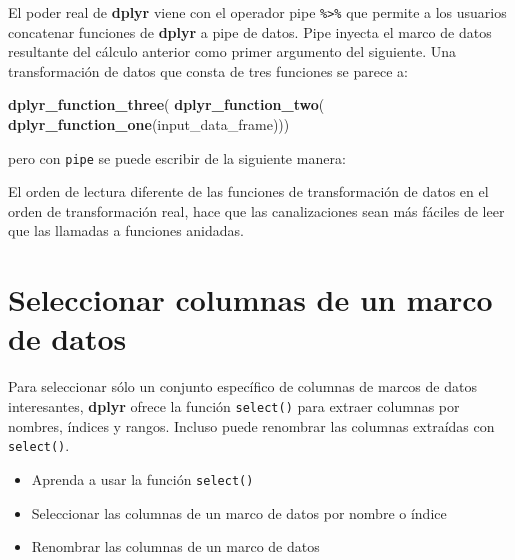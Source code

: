 \documentclass[
]{book}
\newenvironment{Shaded}{\begin{snugshade}}{\end{snugshade}}
\newcommand{\KeywordTok}[1]{\textcolor[rgb]{0.13,0.29,0.53}{\textbf{#1}}}
\newcommand{\NormalTok}[1]{#1}
\newcommand{\OperatorTok}[1]{\textcolor[rgb]{0.81,0.36,0.00}{\textbf{#1}}}
\newcommand{\StringTok}[1]{\textcolor[rgb]{0.31,0.60,0.02}{#1}}
\providecommand{\tightlist}{%
  \setlength{\itemsep}{0pt}\setlength{\parskip}{0pt}}
\begin{document}
El poder real de \textbf{dplyr} viene con el operador pipe \texttt{\%\textgreater{}\%} que permite a los usuarios concatenar funciones de \textbf{dplyr} a pipe de datos. Pipe inyecta el marco de datos resultante del cálculo anterior como primer argumento del siguiente. Una transformación de datos que consta de tres funciones se parece a:

\begin{Shaded}
\begin{Highlighting}[]
\KeywordTok{dplyr_function_three}\NormalTok{(}
  \KeywordTok{dplyr_function_two}\NormalTok{(}
    \KeywordTok{dplyr_function_one}\NormalTok{(input_data_frame)))}
\end{Highlighting}
\end{Shaded}

pero con \texttt{pipe} se puede escribir de la siguiente manera:

\begin{Shaded}
\end{Shaded}

El orden de lectura diferente de las funciones de transformación de datos en el orden de transformación real, hace que las canalizaciones sean más fáciles de leer que las llamadas a funciones anidadas.

\hypertarget{seleccionar-columnas-de-un-marco-de-datos}{%
\section{Seleccionar columnas de un marco de datos}\label{seleccionar-columnas-de-un-marco-de-datos}}

Para seleccionar sólo un conjunto específico de columnas de marcos de datos interesantes, \textbf{dplyr} ofrece la función \texttt{select()} para extraer columnas por nombres, índices y rangos. Incluso puede renombrar las columnas extraídas con \texttt{select()}.

\begin{itemize}
\tightlist
\item
  Aprenda a usar la función \texttt{select()}
\item
  Seleccionar las columnas de un marco de datos por nombre o índice
\item
  Renombrar las columnas de un marco de datos
\end{itemize}
\end{document}
